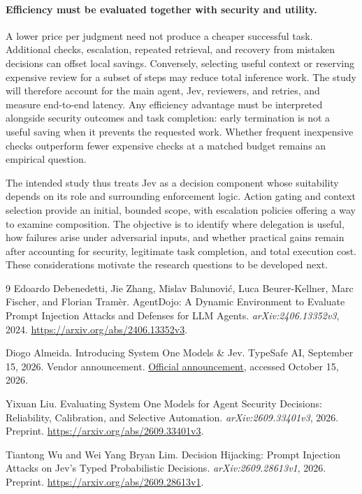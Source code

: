 \documentclass[11pt,a4paper]{article}
\begin{document}
\paragraph{Efficiency must be evaluated together with security and utility.}
A lower price per judgment need not produce a cheaper successful task. Additional checks, escalation, repeated retrieval, and recovery from mistaken decisions can offset local savings. Conversely, selecting useful context or reserving expensive review for a subset of steps may reduce total inference work. The study will therefore account for the main agent, Jev, reviewers, and retries, and measure end-to-end latency. Any efficiency advantage must be interpreted alongside security outcomes and task completion: early termination is not a useful saving when it prevents the requested work. Whether frequent inexpensive checks outperform fewer expensive checks at a matched budget remains an empirical question.

The intended study thus treats Jev as a decision component whose suitability depends on its role and surrounding enforcement logic. Action gating and context selection provide an initial, bounded scope, with escalation policies offering a way to examine composition. The objective is to identify where delegation is useful, how failures arise under adversarial inputs, and whether practical gains remain after accounting for security, legitimate task completion, and total execution cost. These considerations motivate the research questions to be developed next.


\begingroup
\small
\begin{thebibliography}{9}
Edoardo Debenedetti, Jie Zhang, Mislav Balunovi\'c, Luca Beurer-Kellner,
Marc Fischer, and Florian Tram\`er.
\newblock AgentDojo: A Dynamic Environment to Evaluate Prompt Injection Attacks and Defenses for LLM Agents.
\newblock \emph{arXiv:2406.13352v3}, 2024.
\newblock \url{https://arxiv.org/abs/2406.13352v3}.

Diogo Almeida.
\newblock Introducing System One Models \& Jev.
\newblock TypeSafe AI, September 15, 2026. Vendor announcement.
\newblock \href{https://typesafe.ai/blog/introducing-system-one-models-and-jev}{Official announcement}, accessed October 15, 2026.

Yixuan Liu.
\newblock Evaluating System One Models for Agent Security Decisions:
Reliability, Calibration, and Selective Automation.
\newblock \emph{arXiv:2609.33401v3}, 2026. Preprint.
\newblock \url{https://arxiv.org/abs/2609.33401v3}.

Tiantong Wu and Wei Yang Bryan Lim.
\newblock Decision Hijacking: Prompt Injection Attacks on Jev's Typed Probabilistic Decisions.
\newblock \emph{arXiv:2609.28613v1}, 2026. Preprint.
\newblock \url{https://arxiv.org/abs/2609.28613v1}.
\end{thebibliography}
\endgroup
\end{document}
